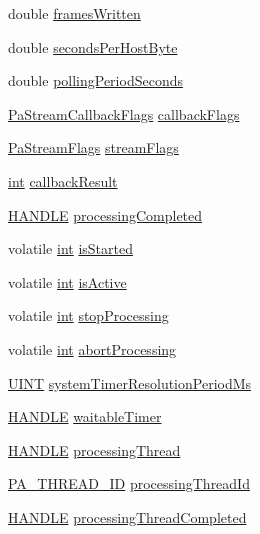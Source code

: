 \begin{DoxyCompactItemize}
\item 
double \hyperlink{struct_pa_win_ds_stream_afd9c498510e8998c1123f1f4d3c00d41}{frames\+Written}
\item 
double \hyperlink{struct_pa_win_ds_stream_ac20b4f0eb3b030a77bc69efabb4606f9}{seconds\+Per\+Host\+Byte}
\item 
double \hyperlink{struct_pa_win_ds_stream_afd0a02b06ef6d65c85ecefbff68976ea}{polling\+Period\+Seconds}
\item 
\hyperlink{portaudio_8h_a55a005924bcfa0424594f4f65cd4ae82}{Pa\+Stream\+Callback\+Flags} \hyperlink{struct_pa_win_ds_stream_a6393a1062d8467feeb9145e88a3b576f}{callback\+Flags}
\item 
\hyperlink{portaudio_8h_a37c7ac3ace7d2dd1430f40ecdee4ebb6}{Pa\+Stream\+Flags} \hyperlink{struct_pa_win_ds_stream_a902670e483a6f6989e1ac84c11b2bd5d}{stream\+Flags}
\item 
\hyperlink{xmltok_8h_a5a0d4a5641ce434f1d23533f2b2e6653}{int} \hyperlink{struct_pa_win_ds_stream_af4cfae9d5f9e287396b6868125decb33}{callback\+Result}
\item 
\hyperlink{_sound_touch_d_l_l_8h_aa8c0374618b33785ccb02f74bcfebc46}{H\+A\+N\+D\+LE} \hyperlink{struct_pa_win_ds_stream_a1350d5353edd1819d5ae4fec49480161}{processing\+Completed}
\item 
volatile \hyperlink{xmltok_8h_a5a0d4a5641ce434f1d23533f2b2e6653}{int} \hyperlink{struct_pa_win_ds_stream_a5a472759667878d811378f2be06a781d}{is\+Started}
\item 
volatile \hyperlink{xmltok_8h_a5a0d4a5641ce434f1d23533f2b2e6653}{int} \hyperlink{struct_pa_win_ds_stream_ab04552e705c27b479607fa0466245659}{is\+Active}
\item 
volatile \hyperlink{xmltok_8h_a5a0d4a5641ce434f1d23533f2b2e6653}{int} \hyperlink{struct_pa_win_ds_stream_a2db908a00a53e01a061721751954f4eb}{stop\+Processing}
\item 
volatile \hyperlink{xmltok_8h_a5a0d4a5641ce434f1d23533f2b2e6653}{int} \hyperlink{struct_pa_win_ds_stream_a1e257d85cd266dcd5ea68b9b6490ec43}{abort\+Processing}
\item 
\hyperlink{mapinls_8h_a36cb3b01d81ffd844bbbfb54003e06ec}{U\+I\+NT} \hyperlink{struct_pa_win_ds_stream_a9f8a44a7ad81453d30b6de38ea282b13}{system\+Timer\+Resolution\+Period\+Ms}
\item 
\hyperlink{_sound_touch_d_l_l_8h_aa8c0374618b33785ccb02f74bcfebc46}{H\+A\+N\+D\+LE} \hyperlink{struct_pa_win_ds_stream_a211f515019c8fc899f1cee1bb3514db4}{waitable\+Timer}
\item 
\hyperlink{_sound_touch_d_l_l_8h_aa8c0374618b33785ccb02f74bcfebc46}{H\+A\+N\+D\+LE} \hyperlink{struct_pa_win_ds_stream_ae08a211344c6db03acbf07cbd001f2b5}{processing\+Thread}
\item 
\hyperlink{pa__win__wmme_8c_af90ebf49f32d984f4cea06ca90506e40}{P\+A\+\_\+\+T\+H\+R\+E\+A\+D\+\_\+\+ID} \hyperlink{struct_pa_win_ds_stream_ae723b0812bffda1934c9334e0b81c2a2}{processing\+Thread\+Id}
\item 
\hyperlink{_sound_touch_d_l_l_8h_aa8c0374618b33785ccb02f74bcfebc46}{H\+A\+N\+D\+LE} \hyperlink{struct_pa_win_ds_stream_a87d6c1cfc09893482fa97c532754c3d6}{processing\+Thread\+Completed}
\end{DoxyCompactItemize}


